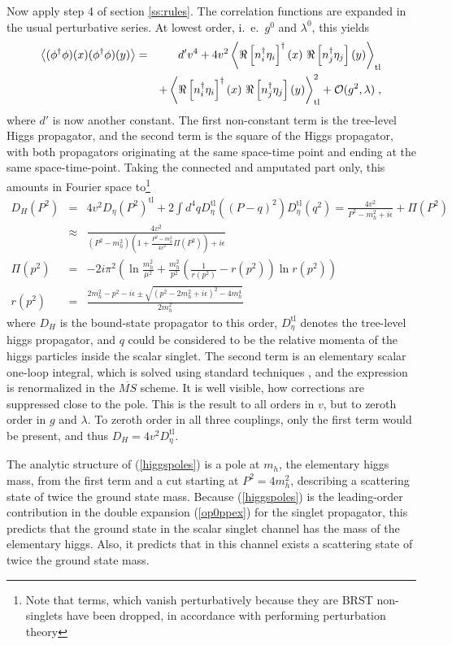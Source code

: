 \documentclass[final,12pt]{article}
\newcommand*{\no}{\noindent}
\newcommand*{\bea}{\begin{eqnarray}}
\newcommand*{\eea}{\end{eqnarray}}
\newcommand*{\pref}[1]{(\ref{#1})}
\newcommand*{\nn}{\nonumber}
\newcommand*{\tl}{\mathrm{tl}}
\newcommand*{\1}{1\!\!\!\bot}
\newcommand*{\la}{\left\langle}
\newcommand*{\ra}{\right\rangle}
\begin{document}
Now apply step 4 of section \ref{ss:rules}. The correlation functions are expanded in the usual perturbative series. At lowest order, i.\ e.\ $g^0$ and $\lambda^0$, this yields
\bea
\la(\phi^\dagger\phi)(x)(\phi^\dagger\phi)(y)\ra& =& d'v^4+4v^2\la \Re\left[n_i^\dagger\eta_i\right]^\dagger(x)~\Re\left[n_j^\dagger\eta_j\right](y) \ra_\text{tl}\label{op0ppex} \\
&&+\la \Re\left[n_i^\dagger\eta_i\right]^\dagger(x)~\Re\left[n_j^\dagger\eta_j\right](y) \ra_\text{tl}^2+{\cal O}(g^2,\lambda)\nn\;,
\eea
\no where $d'$ is now another constant. The first non-constant term is the tree-level Higgs propagator, and the second term is the square of the Higgs propagator, with both propagators originating at the same space-time point and ending at the same space-time-point. Taking the connected and amputated part only, this amounts in Fourier space to\footnote{Note that terms, which vanish perturbatively because they are BRST non-singlets have been dropped, in accordance with performing perturbation theory}
\bea
D_{H}(P^2)&=&4v^2D_\eta(P^2)^\tl+2\int d^4q D_\eta^\tl((P-q)^2)D_\eta^\tl(q^2)=\frac{4v^2}{P^2-m_h^2+i\epsilon}+\Pi(P^2)\label{higgspoles}\\
&\approx&\frac{4v^2}{\left(P^2-m_h^2\right)\left(1+\frac{P^2-m_h^2}{4v^2}\Pi(P^2)\right)+i\epsilon}\nn\\
\Pi(p^2)&=&-2i\pi^2\left(\ln\frac{m_h^2}{\mu^2}+\frac{m_h^2}{p^2}\left(\frac{1}{r(p^2)}-r(p^2)\right)\ln r(p^2)\right)\nn\\
r(p^2)&=&\frac{2m_h^2-p^2-i\epsilon\pm\sqrt{(p^2-2m_h^2+i\epsilon)^2-4m_h^4}}{2m_h^2}\nn
\eea
\no where $D_H$ is the bound-state propagator to this order, $D_\eta^\tl$ denotes the tree-level higgs propagator, and $q$ could be considered to be the relative momenta of the higgs particles inside the scalar singlet. The second term is an elementary scalar one-loop integral, which is solved using standard techniques \cite{Bohm:2001yx}, and the expression is renormalized in the $\overline{MS}$ scheme. It is well visible, how corrections are suppressed close to the pole. This is the result to all orders in $v$, but to zeroth order in $g$ and $\lambda$. To zeroth order in all three couplings, only the first term would be present, and thus $D_H=4v^2D_\eta^\tl$.

The analytic structure of \pref{higgspoles} is a pole at $m_h$, the elementary higgs mass, from the first term and a cut starting at $P^2=4m_h^2$, describing a scattering state of twice the ground state mass. Because \pref{higgspoles} is the leading-order contribution in the double expansion \pref{op0ppex} for the singlet propagator, this predicts that the ground state in the scalar singlet channel has the mass of the elementary higgs. Also, it predicts that in this channel exists a scattering state of twice the ground state mass.
\end{document}
